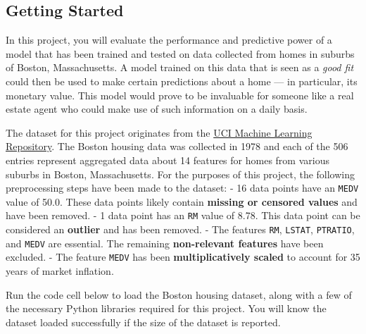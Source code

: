 \documentclass[11pt]{article}
\begin{document}
    \hypertarget{getting-started}{%
\subsection{Getting Started}\label{getting-started}}

In this project, you will evaluate the performance and predictive power
of a model that has been trained and tested on data collected from homes
in suburbs of Boston, Massachusetts. A model trained on this data that
is seen as a \emph{good fit} could then be used to make certain
predictions about a home --- in particular, its monetary value. This
model would prove to be invaluable for someone like a real estate agent
who could make use of such information on a daily basis.

The dataset for this project originates from the
\href{https://archive.ics.uci.edu/ml/datasets/Housing}{UCI Machine
Learning Repository}. The Boston housing data was collected in 1978 and
each of the 506 entries represent aggregated data about 14 features for
homes from various suburbs in Boston, Massachusetts. For the purposes of
this project, the following preprocessing steps have been made to the
dataset: - 16 data points have an
\texttt{\textquotesingle{}MEDV\textquotesingle{}} value of 50.0. These
data points likely contain \textbf{missing or censored values} and have
been removed. - 1 data point has an
\texttt{\textquotesingle{}RM\textquotesingle{}} value of 8.78. This data
point can be considered an \textbf{outlier} and has been removed. - The
features \texttt{\textquotesingle{}RM\textquotesingle{}},
\texttt{\textquotesingle{}LSTAT\textquotesingle{}},
\texttt{\textquotesingle{}PTRATIO\textquotesingle{}}, and
\texttt{\textquotesingle{}MEDV\textquotesingle{}} are essential. The
remaining \textbf{non-relevant features} have been excluded. - The
feature \texttt{\textquotesingle{}MEDV\textquotesingle{}} has been
\textbf{multiplicatively scaled} to account for 35 years of market
inflation.

Run the code cell below to load the Boston housing dataset, along with a
few of the necessary Python libraries required for this project. You
will know the dataset loaded successfully if the size of the dataset is
reported.
\end{document}
